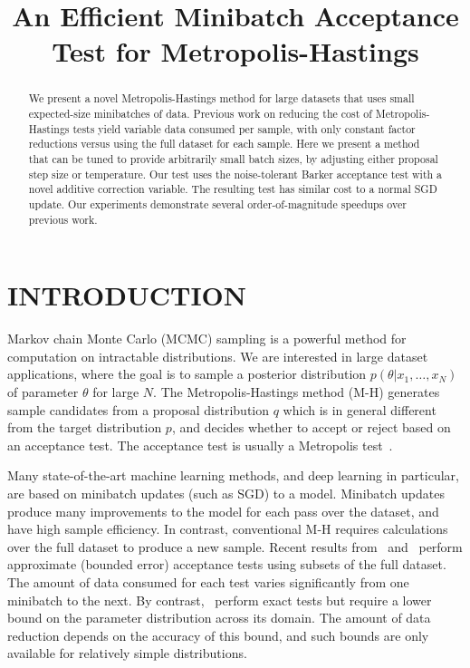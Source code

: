 \documentclass[letterpaper]{article}
\title{An Efficient Minibatch Acceptance Test for Metropolis-Hastings}
\author{} %
\begin{document}
\maketitle

\begin{abstract}
  We present a novel Metropolis-Hastings method for large datasets that
  uses small expected-size minibatches of data. Previous work on
  reducing the cost of Metropolis-Hastings tests yield variable data
  consumed per sample, with only constant factor reductions versus
  using the full dataset for each sample.  Here we present a method
  that can be tuned to provide arbitrarily small batch sizes, by
  adjusting either proposal step size or temperature. Our test uses
  the noise-tolerant Barker acceptance test with a novel additive
  correction variable.  The resulting test has similar cost to a normal
  SGD update. Our experiments demonstrate several order-of-magnitude
  speedups over previous work.
\end{abstract}



\section{INTRODUCTION}\label{sec:introduction}

Markov chain Monte Carlo (MCMC) sampling is a powerful method for computation on
intractable distributions. We are interested in large dataset applications,
where the goal is to sample a posterior distribution $p(\theta | x_1, \ldots,
x_N)$ of parameter $\theta$ for large $N$.  The Metropolis-Hastings method (M-H)
generates sample candidates from a proposal distribution $q$ which is in general
different from the target distribution $p$, and decides whether to accept or
reject based on an acceptance test. The acceptance test is usually a Metropolis
test~\citep{Metropolis1953, hastings70}.

Many state-of-the-art machine learning methods, and deep learning in particular,
are based on minibatch updates (such as SGD) to a model.  Minibatch updates
produce many improvements to the model for each pass over the dataset, and have
high sample efficiency.  In contrast, conventional M-H requires calculations
over the full dataset to produce a new sample.  Recent results
from~\citep{cutting_mh_2014} and~\citep{icml2014c1_bardenet14} perform
approximate (bounded error) acceptance tests using subsets of the full dataset.
The amount of data consumed for each test varies significantly from one
minibatch to the next. By contrast,~\citep{conf/uai/MaclaurinA14,TallData16}
perform exact tests but require a lower bound on the parameter distribution across
its domain.  The amount of data reduction depends on the accuracy of this bound,
and such bounds are only available for relatively simple distributions.
\end{document}
